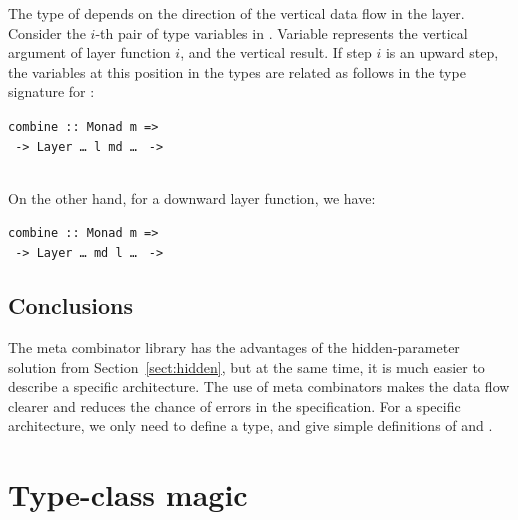 \documentclass[preprint,natbib]{sigplanconf}
\begin{document}
The type of  depends on the direction of the vertical data flow in the layer. Consider the $i$-th pair of  type variables in . Variable  represents the vertical argument of layer function $i$, and  the vertical result. If step $i$ is an upward step, the variables at this position in the  types are related as follows in the type signature for :

\begin{small}
\begin{tabbing}
{\tt  combine :: }\={\tt Monad m =>}\\
                  \verb| -> |{\tt Layer \dots~l~md \dots} \verb| ->|\\
                  \\
\end{tabbing}
\end{small}

On the other hand, for a downward layer function, we have:

\begin{small}
\begin{tabbing}
{\tt  combine :: }\={\tt Monad m =>}\\
                  \verb| -> |{\tt Layer \dots~md l \dots} \verb| ->|\\
\end{tabbing}
\end{small}


\subsection{Conclusions} 

The meta combinator library has the advantages of the hidden-parameter solution from Section~\ref{sect:hidden}, but at the same time, it is much easier to describe a specific architecture. The use of meta combinators makes the data flow clearer and reduces the chance of errors in the specification. For a specific architecture, we only need to define a  type, and give simple definitions of  and .









%																
%																
%																
\section{Type-class magic} \label{sect:typeClass}
\end{document}
